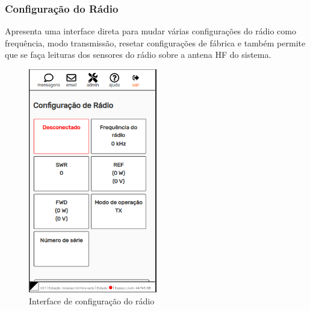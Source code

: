 \documentclass[11pt,a4paper]{article}
\begin{document}
    
\subsubsection{Configuração do Rádio}
\label{gui_radio_config}

Apresenta uma interface direta para mudar várias configurações do rádio como frequência, modo transmissão, resetar configurações de fábrica e também permite que se faça leituras dos sensores do rádio sobre a antena HF do sistema.



\begin{figure}[H]
    \centering
    \includegraphics[width=0.5\textwidth]{screenshots/frontend/pt_kn/radioconfig.png}
    \caption{Interface de configuração do rádio}
	\vspace{-10pt}
    \label{fig:radioconf}
\end{figure}    
\end{document}

